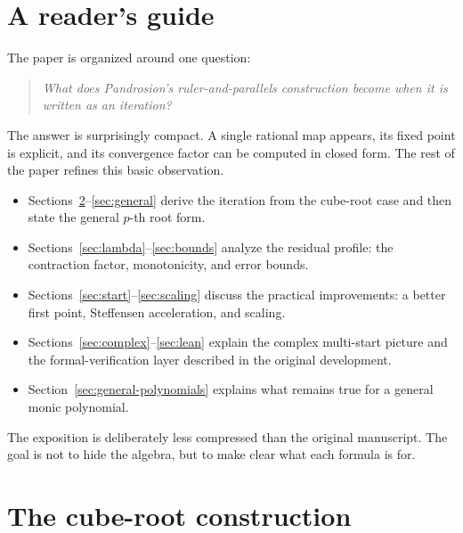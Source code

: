 \documentclass[11pt,a4paper]{article}
\theoremstyle{plain}
\theoremstyle{definition}
\theoremstyle{remark}
\begin{document}
\section{A reader's guide}

The paper is organized around one question:

\begin{quote}
\emph{What does Pandrosion's ruler-and-parallels construction become when it is
written as an iteration?}
\end{quote}

The answer is surprisingly compact.  A single rational map appears, its fixed
point is explicit, and its convergence factor can be computed in closed form.
The rest of the paper refines this basic observation.

\begin{itemize}
  \item Sections~\ref{sec:cube}--\ref{sec:general} derive the iteration from
  the cube-root case and then state the general $p$-th root form.
  \item Sections~\ref{sec:lambda}--\ref{sec:bounds} analyze the residual
  profile: the contraction factor, monotonicity, and error bounds.
  \item Sections~\ref{sec:start}--\ref{sec:scaling} discuss the practical
  improvements: a better first point, Steffensen acceleration, and scaling.
  \item Sections~\ref{sec:complex}--\ref{sec:lean} explain the complex
  multi-start picture and the formal-verification layer described in the
  original development.
  \item Section~\ref{sec:general-polynomials} explains what remains true for
  a general monic polynomial.
\end{itemize}

The exposition is deliberately less compressed than the original manuscript.
The goal is not to hide the algebra, but to make clear what each formula is
for.

\section{The cube-root construction}
\label{sec:cube}
\end{document}
